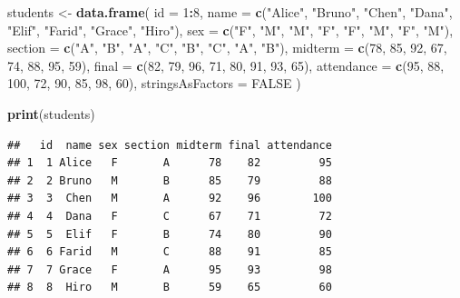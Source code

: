 \documentclass[
]{article}
\newenvironment{Shaded}{\begin{snugshade}}{\end{snugshade}}
\newcommand{\AttributeTok}[1]{\textcolor[rgb]{0.13,0.29,0.53}{#1}}
\newcommand{\ConstantTok}[1]{\textcolor[rgb]{0.56,0.35,0.01}{#1}}
\newcommand{\DecValTok}[1]{\textcolor[rgb]{0.00,0.00,0.81}{#1}}
\newcommand{\FunctionTok}[1]{\textcolor[rgb]{0.13,0.29,0.53}{\textbf{#1}}}
\newcommand{\NormalTok}[1]{#1}
\newcommand{\OtherTok}[1]{\textcolor[rgb]{0.56,0.35,0.01}{#1}}
\newcommand{\SpecialCharTok}[1]{\textcolor[rgb]{0.81,0.36,0.00}{\textbf{#1}}}
\newcommand{\StringTok}[1]{\textcolor[rgb]{0.31,0.60,0.02}{#1}}
\begin{document}
\begin{Shaded}
\begin{Highlighting}[]
\NormalTok{students }\OtherTok{\textless{}{-}} \FunctionTok{data.frame}\NormalTok{(}
  \AttributeTok{id =} \DecValTok{1}\SpecialCharTok{:}\DecValTok{8}\NormalTok{,}
  \AttributeTok{name =} \FunctionTok{c}\NormalTok{(}\StringTok{"Alice"}\NormalTok{, }\StringTok{"Bruno"}\NormalTok{, }\StringTok{"Chen"}\NormalTok{, }\StringTok{"Dana"}\NormalTok{,}
           \StringTok{"Elif"}\NormalTok{, }\StringTok{"Farid"}\NormalTok{, }\StringTok{"Grace"}\NormalTok{, }\StringTok{"Hiro"}\NormalTok{),}
  \AttributeTok{sex =} \FunctionTok{c}\NormalTok{(}\StringTok{"F"}\NormalTok{, }\StringTok{"M"}\NormalTok{, }\StringTok{"M"}\NormalTok{, }\StringTok{"F"}\NormalTok{, }\StringTok{"F"}\NormalTok{, }\StringTok{"M"}\NormalTok{, }\StringTok{"F"}\NormalTok{, }\StringTok{"M"}\NormalTok{),}
  \AttributeTok{section =} \FunctionTok{c}\NormalTok{(}\StringTok{"A"}\NormalTok{, }\StringTok{"B"}\NormalTok{, }\StringTok{"A"}\NormalTok{, }\StringTok{"C"}\NormalTok{, }\StringTok{"B"}\NormalTok{, }\StringTok{"C"}\NormalTok{, }\StringTok{"A"}\NormalTok{, }\StringTok{"B"}\NormalTok{),}
  \AttributeTok{midterm =} \FunctionTok{c}\NormalTok{(}\DecValTok{78}\NormalTok{, }\DecValTok{85}\NormalTok{, }\DecValTok{92}\NormalTok{, }\DecValTok{67}\NormalTok{, }\DecValTok{74}\NormalTok{, }\DecValTok{88}\NormalTok{, }\DecValTok{95}\NormalTok{, }\DecValTok{59}\NormalTok{),}
  \AttributeTok{final =} \FunctionTok{c}\NormalTok{(}\DecValTok{82}\NormalTok{, }\DecValTok{79}\NormalTok{, }\DecValTok{96}\NormalTok{, }\DecValTok{71}\NormalTok{, }\DecValTok{80}\NormalTok{, }\DecValTok{91}\NormalTok{, }\DecValTok{93}\NormalTok{, }\DecValTok{65}\NormalTok{),}
  \AttributeTok{attendance =} \FunctionTok{c}\NormalTok{(}\DecValTok{95}\NormalTok{, }\DecValTok{88}\NormalTok{, }\DecValTok{100}\NormalTok{, }\DecValTok{72}\NormalTok{, }\DecValTok{90}\NormalTok{, }\DecValTok{85}\NormalTok{, }\DecValTok{98}\NormalTok{, }\DecValTok{60}\NormalTok{),}
  \AttributeTok{stringsAsFactors =} \ConstantTok{FALSE}
\NormalTok{)}

\FunctionTok{print}\NormalTok{(students)}
\end{Highlighting}
\end{Shaded}

\begin{verbatim}
##   id  name sex section midterm final attendance
## 1  1 Alice   F       A      78    82         95
## 2  2 Bruno   M       B      85    79         88
## 3  3  Chen   M       A      92    96        100
## 4  4  Dana   F       C      67    71         72
## 5  5  Elif   F       B      74    80         90
## 6  6 Farid   M       C      88    91         85
## 7  7 Grace   F       A      95    93         98
## 8  8  Hiro   M       B      59    65         60
\end{verbatim}
\end{document}
